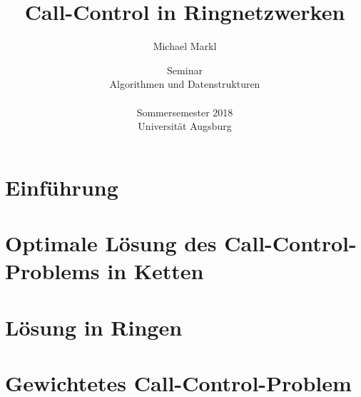 \documentclass[11pt]{article}
\title{\bfseries Call-Control in Ringnetzwerken}
\author{Michael Markl}
\date{Seminar\\ \glqq Algorithmen und Datenstrukturen\grqq\\~ \\Sommersemester 2018\\ Universität Augsburg}
\theoremstyle{definition}
\theoremstyle{theorem}
\theoremstyle{theorem}
\begin{document}
    \maketitle

    \section{Einführung}\label{sec:einführung}
    

	\section{Optimale Lösung des Call-Control-Problems in Ketten}\label{sec:call-control-in-chains}
	

    \section{Lösung in Ringen}\label{sec:call-control-in-rings}
    

    \section{Gewichtetes Call-Control-Problem}\label{sec:weighted-call-control}
    

    
    
\end{document}
